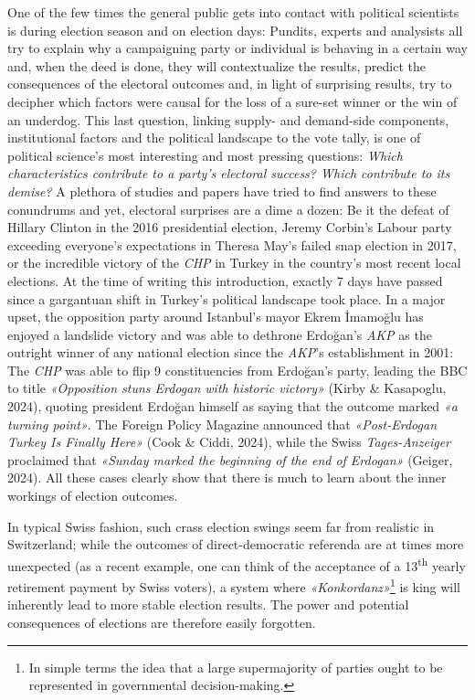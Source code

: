 \documentclass[11pt,a4paper]{article}
\begin{document}
One of the few times the general public gets into contact with political scientists is during election season and on election days: Pundits, experts and analysists all try to explain why a campaigning party or individual is behaving in a certain way and, when the deed is done, they will contextualize the results, predict the consequences of the electoral outcomes and, in light of surprising results, try to decipher which factors were causal for the loss of a sure-set winner or the win of an underdog. This last question, linking supply- and demand-side components, institutional factors and the political landscape to the vote tally, is one of political science’s most interesting and most pressing questions: \textit{Which characteristics contribute to a party’s electoral success? Which contribute to its demise?} A plethora of studies and papers have tried to find answers to these conundrums and yet, electoral surprises are a dime a dozen: Be it the defeat of Hillary Clinton in the 2016 presidential election, Jeremy Corbin’s Labour party exceeding everyone’s expectations in Theresa May’s failed snap election in 2017, or the incredible victory of the \textit{CHP} in Turkey in the country’s most recent local elections. At the time of writing this introduction, exactly 7 days have passed since a gargantuan shift in Turkey’s political landscape took place. In a major upset, the opposition party around Istanbul’s mayor Ekrem İmamoğlu has enjoyed a landslide victory and was able to dethrone Erdoğan’s \textit{AKP} as the outright winner of any national election since the \textit{AKP}’s establishment in 2001: The \textit{CHP }was able to flip 9 constituencies from Erdoğan’s party, leading the BBC to title \textit{«Opposition stuns Erdogan with historic victory»} (Kirby \& Kasapoglu, 2024), quoting president Erdoğan himself as saying that the outcome marked \textit{«a turning point»}. The Foreign Policy Magazine announced that \textit{«Post-Erdogan Turkey Is Finally Here»} (Cook \& Ciddi, 2024), while the Swiss \textit{Tages-Anzeiger} proclaimed that \textit{«Sunday marked the beginning of the end of Erdogan»} (Geiger, 2024). All these cases clearly show that there is much to learn about the inner workings of election outcomes.

In typical Swiss fashion, such crass election swings seem far from realistic in Switzerland; while the outcomes of direct-democratic referenda are at times more unexpected (as a recent example, one can think of the acceptance of a 13\textsuperscript{th} yearly retirement payment by Swiss voters), a system where \textit{«Konkordanz»}\footnote{In simple terms the idea that a large supermajority of parties ought to be represented in governmental decision-making.} is king will inherently lead to more stable election results. The power and potential consequences of elections are therefore easily forgotten.
\end{document}
